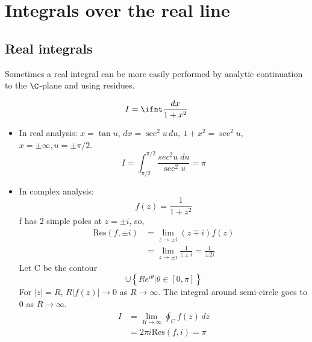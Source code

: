\documentclass[a4paper, 11pt, normalem]{report}
\begin{document}
\chapter{Integrals over the real line}
\section{Real integrals}
Sometimes a real integral can be more easily performed by analytic continuation to the $\C$-plane and using residues.
\begin{example}[1]
    \begin{equation}
        I = \ifnt \frac{dx}{1 + x^2}
    \end{equation}
    \begin{itemize}
        \item In real analysis: $x =\tan u$, $dx = \sec^2u\,du$, $1 + x^2 = \sec^2u$, $x = \pm \infty, u = \pm \pi/2$.
            \begin{equation}
                I = \int_{\pi/2}^{\pi/2} \frac{sec^2u\;du}{\sec^2u} = \pi
            \end{equation}
        \item In complex analysis:
            \begin{equation}
                f(z) = \frac{1}{1 + z^2}
            \end{equation}
            f has 2 simple poles at $z = \pm i$, so, 
            \begin{align}
                \text{Res}(f,\pm i) &= \lim_{z\to\pm i} (z \mp i)f(z) \\
                                    &= \lim_{z\to\pm i} \frac{1}{z\pm i} = \frac{1}{\pm 2i}
            \end{align}
            Let C be the contour
            \begin{equation}
                [-R,R] \cup \left\{Re^{i\theta} | \theta \in [0,\pi]\right\}
            \end{equation}
            For $|z| = R$, $R|f(z)| \to 0$ as $R \to \infty$.
            The integral around semi-circle goes to 0 as $R \to \infty$.
            \begin{align}
                I &= \lim_{R\to\infty} \oint_C f(z)\,dz \\
                  &= 2\pi i \text{Res}(f,i) = \pi
            \end{align}
    \end{itemize}
\end{example}
\end{document}
